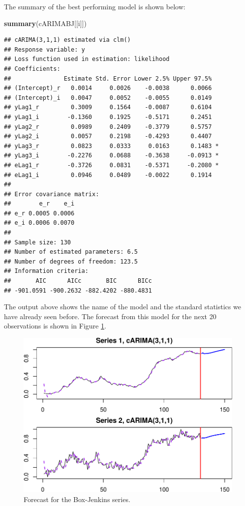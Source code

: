 \documentclass[
]{book}
\newenvironment{Shaded}{\begin{snugshade}}{\end{snugshade}}
\newcommand{\KeywordTok}[1]{\textcolor[rgb]{0.13,0.29,0.53}{\textbf{#1}}}
\newcommand{\NormalTok}[1]{#1}
\begin{document}
The summary of the best performing model is shown below:

\begin{Shaded}
\begin{Highlighting}[]
\KeywordTok{summary}\NormalTok{(cARIMABJ[[i]])}
\end{Highlighting}
\end{Shaded}

\begin{verbatim}
## cARIMA(3,1,1) estimated via clm()
## Response variable: y
## Loss function used in estimation: likelihood
## Coefficients:
##               Estimate Std. Error Lower 2.5% Upper 97.5%  
## (Intercept)_r   0.0014     0.0026    -0.0038      0.0066  
## (Intercept)_i   0.0047     0.0052    -0.0055      0.0149  
## yLag1_r         0.3009     0.1564    -0.0087      0.6104  
## yLag1_i        -0.1360     0.1925    -0.5171      0.2451  
## yLag2_r         0.0989     0.2409    -0.3779      0.5757  
## yLag2_i         0.0057     0.2198    -0.4293      0.4407  
## yLag3_r         0.0823     0.0333     0.0163      0.1483 *
## yLag3_i        -0.2276     0.0688    -0.3638     -0.0913 *
## eLag1_r        -0.3726     0.0831    -0.5371     -0.2080 *
## eLag1_i         0.0946     0.0489    -0.0022      0.1914  
## 
## Error covariance matrix:
##        e_r    e_i
## e_r 0.0005 0.0006
## e_i 0.0006 0.0070
## 
## Sample size: 130
## Number of estimated parameters: 6.5
## Number of degrees of freedom: 123.5
## Information criteria:
##       AIC      AICc       BIC      BICc 
## -901.0591 -900.2632 -882.4202 -880.4831
\end{verbatim}

The output above shows the name of the model and the standard statistics we have already seen before. The forecast from this model for the next 20 observations is shown in Figure \ref{fig:BJSalesComplexForecast}.

\begin{figure}
\centering
\includegraphics{Svetunkov---Svetunkov---Complex-Valued-Econometrics_files/figure-latex/BJSalesComplexForecast-1.pdf}
\caption{\label{fig:BJSalesComplexForecast}Forecast for the Box-Jenkins series.}
\end{figure}
\end{document}
